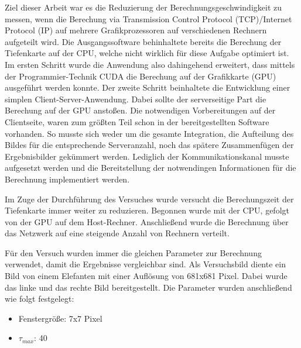 \documentclass[times, 10pt,twocolumn]{article}
\begin{document}
Ziel dieser Arbeit war es die Reduzierung der Berechnungsgeschwindigkeit zu messen, wenn die Berechung via Transmission Control Protocol (TCP)/Internet Protocol (IP) auf mehrere Grafikprozessoren auf verschiedenen Rechnern aufgeteilt wird.
Die Ausgangssoftware behinhaltete bereits die Berechung der Tiefenkarte auf der CPU, welche nicht wirklich für diese Aufgabe optimiert ist. Im ersten Schritt wurde die Anwendung also dahingehend erweitert, dass mittels der Programmier-Technik CUDA die Berechung auf der Grafikkarte (GPU) ausgeführt werden konnte.
Der zweite Schritt beinhaltete die Entwicklung einer simplen Client-Server-Anwendung. Dabei sollte der serverseitige Part die Berechung auf der GPU anstoßen. Die notwendigen Vorbereitungen auf der Clientseite, waren zum größten Teil schon in der bereitgestellten Software vorhanden. So musste sich weder um die gesamte Integration, die Aufteilung des Bildes für die entsprechende Serveranzahl, noch das spätere Zusammenfügen der Ergebnisbilder gekümmert werden. Lediglich der Kommunikationskanal musste aufgesetzt werden und die Bereitstellung der notwendingen Informationen für die Berechnung implementiert werden.

Im Zuge der Durchführung des Versuches wurde versucht die Berechungszeit der Tiefenkarte immer weiter zu reduzieren. Begonnen wurde mit der CPU, gefolgt von der GPU auf dem Host-Rechner. Anschließend wurde die Berechnung über das Netzwerk auf eine steigende Anzahl von Rechnern verteilt. 

Für den Versuch wurden immer die gleichen Parameter zur Berechnung verwendet, damit die Ergebnisse vergleichbar sind. Als Versuchsbild diente ein Bild von einem Elefanten mit einer Auflösung von 681x681 Pixel. Dabei wurde das linke und das rechte Bild bereitgestellt. Die Parameter wurden anschließend wie folgt festgelegt: 
\begin{itemize}
\setlength\itemsep{0.1px}
      \item Fenstergröße: 7x7 Pixel
      \item $\tau_{max}$: 40
\end{itemize}
\end{document}
